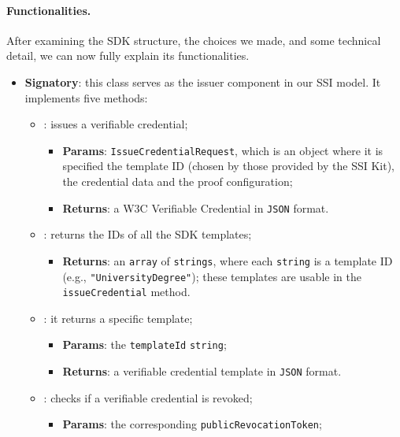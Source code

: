 \paragraph{Functionalities.}
After examining the SDK structure, the choices we made, and some technical detail, we can now 
fully explain its functionalities.
\begin{itemize}
    \setlength{\itemsep}{1cm}

    \item \textbf{Signatory}: this class serves as the issuer component in our
    SSI model. It implements five methods:
    \begin{itemize}
        \setlength{\itemsep}{0.4cm}
        \item[] : issues a verifiable credential;
        \begin{itemize}
            \item \textbf{Params}: \texttt{IssueCredentialRequest}, which is an object where 
            it is specified the template ID (chosen by those provided by the SSI Kit), the
            credential data and the proof configuration;
            \item \textbf{Returns}: a W3C Verifiable Credential in \texttt{JSON} format.
        \end{itemize}
        \item[] : returns the IDs of all the SDK templates;
        \begin{itemize}
            \item \textbf{Returns}: an \texttt{array} of \texttt{strings}, where each \texttt{string} is a template ID
            (e.g., \texttt{"UniversityDegree"}); these templates are usable in the
            \texttt{issueCredential} method.
        \end{itemize}
        \item[] : it returns a specific template;
        \begin{itemize}
            \item \textbf{Params}: the \texttt{templateId} \texttt{string};
            \item \textbf{Returns}: a verifiable credential template in \texttt{JSON} format.
        \end{itemize}
        \item[] : checks if a verifiable credential is revoked;
        \label{method:isRevoked}
        \begin{itemize}
            \item \textbf{Params}: the corresponding \texttt{publicRevocationToken};

\end{itemize}
\end{itemize}
\end{itemize}
